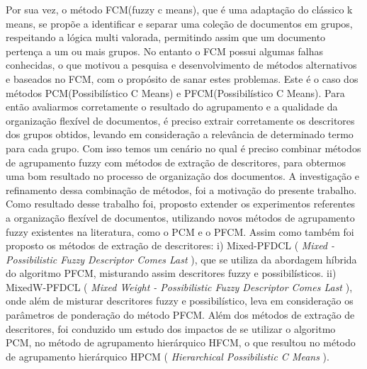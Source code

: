 Por sua vez, o método
FCM(fuzzy c means), que é uma adaptação do clássico k means, se propõe a identificar e separar uma
coleção de documentos em grupos, respeitando a lógica multi valorada, permitindo assim que um
documento pertença a um ou mais grupos. No entanto o FCM possui algumas falhas conhecidas, o que
motivou a pesquisa e desenvolvimento de métodos alternativos e baseados no FCM, com o propósito de
sanar estes problemas.  Este é o caso dos métodos PCM(Possibilístico C Means) e PFCM(Possibilístico
C Means).  Para então avaliarmos corretamente o resultado do agrupamento e a qualidade da
organização flexível de documentos, é preciso extrair corretamente os descritores dos grupos
obtidos, levando em consideração a relevância de determinado termo para cada grupo. Com isso temos
um cenário no qual é preciso combinar métodos de agrupamento fuzzy com métodos de extração de
descritores, para obtermos uma bom resultado no processo de organização dos documentos. A
investigação e refinamento dessa combinação de métodos, foi a motivação do presente trabalho. Como
resultado desse trabalho foi, proposto extender os experimentos referentes a organização flexível de
documentos, utilizando novos métodos de agrupamento fuzzy existentes na literatura, como o PCM e o
PFCM. Assim como também foi proposto os métodos de extração de descritores: i) Mixed-PFDCL ({ \it
Mixed - Possibilistic Fuzzy Descriptor Comes Last\/ }), que se utiliza da abordagem híbrida do
algoritmo PFCM, misturando assim descritores fuzzy e possibilísticos. ii) MixedW-PFDCL ({ \it Mixed
Weight - Possibilistic Fuzzy Descriptor Comes Last\/ }), onde além de misturar descritores fuzzy e
possibilístico, leva em consideração os parâmetros de ponderação do método PFCM.  Além dos métodos
de extração de descritores, foi conduzido um estudo dos impactos de se utilizar o algoritmo PCM, no
método de agrupamento hierárquico HFCM, o que resultou no método de agrupamento hierárquico HPCM ({
\it Hierarchical Possibilistic C Means\/ }).
